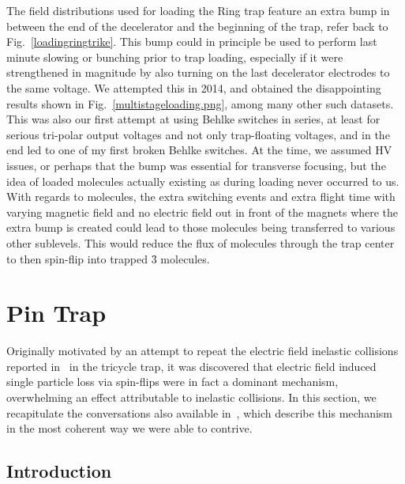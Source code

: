 The field distributions used for loading the Ring trap feature an extra bump in between the end of the decelerator and the beginning of the trap, refer back to Fig.~\ref{loadingringtrike}.
This bump could in principle be used to perform last minute slowing or bunching prior to trap loading, especially if it were strengthened in magnitude by also turning on the last decelerator electrodes to the same voltage.
We attempted this in 2014, and obtained the disappointing results shown in Fig.~\ref{multistageloading.png}, among many other such datasets.
This was also our first attempt at using Behlke switches in series, at least for serious tri-polar output voltages and not only trap-floating voltages, and in the end led to one of my first broken Behlke switches.
At the time, we assumed HV issues, or perhaps that the bump was essential for transverse focusing, but the idea of loaded molecules actually existing as  during loading never occurred to us.
With regards to  molecules, the extra switching events and extra flight time with varying magnetic field and no electric field out in front of the magnets where the extra bump is created could lead to those molecules being transferred to various other sublevels.
This would reduce the flux of  molecules through the trap center to then spin-flip into trapped \f3 molecules.



\section{Pin Trap}
\label{sec:pintrap}

Originally motivated by an attempt to repeat the electric field inelastic collisions reported in~\cite{Stuhl2013} in the tricycle trap, it was discovered that electric field induced single particle loss via spin-flips were in fact a dominant mechanism, overwhelming an effect attributable to inelastic collisions.
In this section, we recapitulate the conversations also available in~\cite{Reens2017}, which describe this mechanism in the most coherent way we were able to contrive.

\subsection{Introduction}

